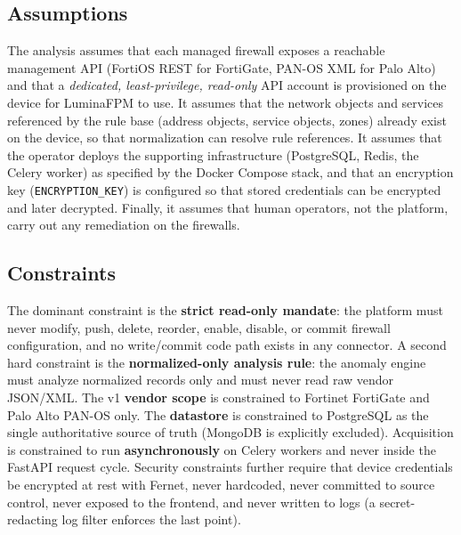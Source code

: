 \subsection{Assumptions}
\label{sec:ch3-assumptions}
The analysis assumes that each managed firewall exposes a reachable management API (FortiOS REST for FortiGate, PAN-OS XML for Palo Alto) and that a \emph{dedicated, least-privilege, read-only} API account is provisioned on the device for LuminaFPM to use. It assumes that the network objects and services referenced by the rule base (address objects, service objects, zones) already exist on the device, so that normalization can resolve rule references. It assumes that the operator deploys the supporting infrastructure (PostgreSQL, Redis, the Celery worker) as specified by the Docker Compose stack, and that an encryption key (\texttt{ENCRYPTION\_KEY}) is configured so that stored credentials can be encrypted and later decrypted. Finally, it assumes that human operators, not the platform, carry out any remediation on the firewalls.

\subsection{Constraints}
\label{sec:ch3-constraints}
The dominant constraint is the \textbf{strict read-only mandate}: the platform must never modify, push, delete, reorder, enable, disable, or commit firewall configuration, and no write/commit code path exists in any connector. A second hard constraint is the \textbf{normalized-only analysis rule}: the anomaly engine must analyze normalized records only and must never read raw vendor JSON/XML. The v1 \textbf{vendor scope} is constrained to Fortinet FortiGate and Palo Alto PAN-OS only. The \textbf{datastore} is constrained to PostgreSQL as the single authoritative source of truth (MongoDB is explicitly excluded). Acquisition is constrained to run \textbf{asynchronously} on Celery workers and never inside the FastAPI request cycle. Security constraints further require that device credentials be encrypted at rest with Fernet, never hardcoded, never committed to source control, never exposed to the frontend, and never written to logs (a secret-redacting log filter enforces the last point).

